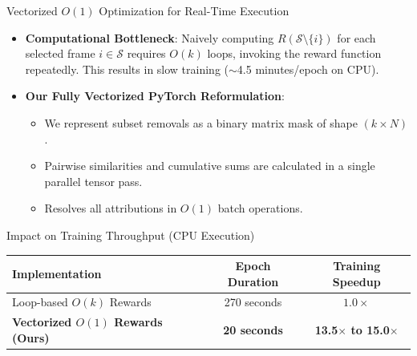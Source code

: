 \documentclass[aspectratio=169]{beamer}
\begin{document}
\begin{frame}{Vectorized $O(1)$ Optimization for Real-Time Execution}
    \begin{itemize}
        \item \textbf{Computational Bottleneck}:
        Naively computing $R(\mathcal{S} \setminus \{i\})$ for each selected frame $i \in \mathcal{S}$ requires $O(k)$ loops, invoking the reward function repeatedly. This results in slow training ($\sim$4.5 minutes/epoch on CPU).
        \item \textbf{Our Fully Vectorized PyTorch Reformulation}:
        \begin{itemize}
            \item We represent subset removals as a binary matrix mask of shape $(k \times N)$.
            \item Pairwise similarities and cumulative sums are calculated in a single parallel tensor pass.
            \item Resolves all attributions in $O(1)$ batch operations.
        \end{itemize}
    \end{itemize}
    \begin{block}{Impact on Training Throughput (CPU Execution)}
        \centering
        \begin{tabular}{lcc}
            \toprule
            \textbf{Implementation} & \textbf{Epoch Duration} & \textbf{Training Speedup} \\
            \midrule
            Loop-based $O(k)$ Rewards & 270 seconds & $1.0\times$ \\
            \textbf{Vectorized $O(1)$ Rewards (Ours)} & \textbf{20 seconds} & \textbf{13.5$\times$ to 15.0$\times$} \\
            \bottomrule
        \end{tabular}
    \end{block}
\end{frame}
\end{document}
